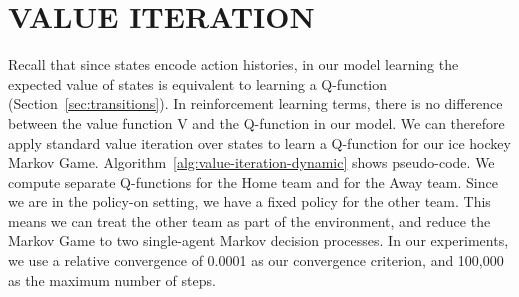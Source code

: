 \documentclass[]{article}
\begin{document}
\section{VALUE ITERATION}
\label{subsec:value-iteration-alg}

Recall that since states encode action histories, in our model learning the expected value of states is equivalent to learning a Q-function (Section~\ref{sec:transitions}). In reinforcement learning terms, there is no difference between the value function V and the Q-function in our model. We can therefore apply standard value iteration over states \citep{bib:sutton} to learn a Q-function
 for our ice hockey Markov Game. Algorithm~\ref{alg:value-iteration-dynamic} shows pseudo-code. We compute separate Q-functions for the Home team and for the Away team. Since we are in the policy-on setting, we have a fixed policy for the other team. This means we can treat the other team as part of the environment, and reduce the Markov Game to two single-agent Markov decision processes. %
 In our experiments, we use a relative convergence of 0.0001 as our convergence criterion, and 100,000 as the maximum number of steps.%
%
%
%
%
%
\end{document}
